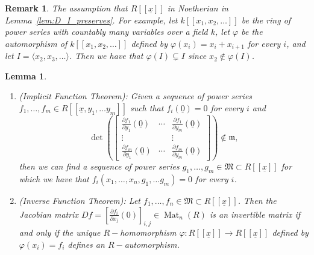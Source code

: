 \documentclass{article}
\newtheorem{lemma}[theorem]{Lemma}
\newtheorem{remark}[theorem]{Remark}
\DeclareMathOperator{\Mat}{Mat}
\newcommand{\maxV}{\mathfrak{m}_V}
\newcommand{\Vx}{V[[\underline{x}]]}
\numberwithin{theorem}{section}
\begin{document}
\begin{remark}
\textup{The assumption that $R[[\underline{x}]]$ in Noetherian in Lemma~\ref{lem:D_I_preserves}. For example, let $k[[x_1, x_2, \dots ]]$ be the ring of power series with countably many variables over a field $k$, let $\varphi$ be the automorphism of $k[[x_1, x_2, \dots ]]$ defined by $\varphi(x_i)=x_i+x_{i+1}$ for every $i$, and let $I=\langle x_2, x_3, \dots \rangle$. Then we have that $\varphi(I) \subsetneq I$ since $x_2 \notin \varphi(I)$. }
\end{remark}

\begin{lemma}\label{lem:W[[x]]_good_prop}
\begin{enumerate}
    \item \textup{(Implicit Function Theorem)}: Given a sequence of power series $f_1, \dots, f_m \in R[[\underline{x},y_1, \dots y_m]]$ such that $f_i(\underline{0})=0$ for every $i$ and 
    \begin{equation*}
    \det \left(
        \begin{bmatrix}
            \frac{\partial f_1}{\partial y_1}(\underline{0}) & \cdots & \frac{\partial f_1}{\partial y_m}(\underline{0})\\
            \vdots & & \vdots \\
            \frac{\partial f_m}{\partial y_1}(\underline{0}) & \cdots & \frac{\partial f_m}{\partial y_m}(\underline{0})
        \end{bmatrix}
        \right) \notin \mathfrak{m},
    \end{equation*}
    then we can find a sequence of power series $g_1, \dots, g_m \in \mathfrak{M} \subset R[[\underline{x}]]$ for which we have that $f_i\left(x_1, \dots, x_n, g_1, \dots g_m\right)=0$ for every $i$. 
    \item \textup{(Inverse Function Theorem)}: Let $f_1, \dots, f_n \in \mathfrak{M} \subset R[[\underline{x}]]$. Then the  Jacobian matrix $Df=\left[\frac{\partial f_i}{\partial x_j}\left(0\right)\right]_{i,j} \in \Mat_n\left(R\right)$ is an invertible matrix if and only if the unique $R-$homomorphism $\varphi \colon R[[\underline{x}]] \to R[[\underline{x}]]$ defined by $\varphi\left(x_i\right)=f_i$ defines an $R-$automorphism. 
\end{enumerate}
\end{lemma}
\end{document}
